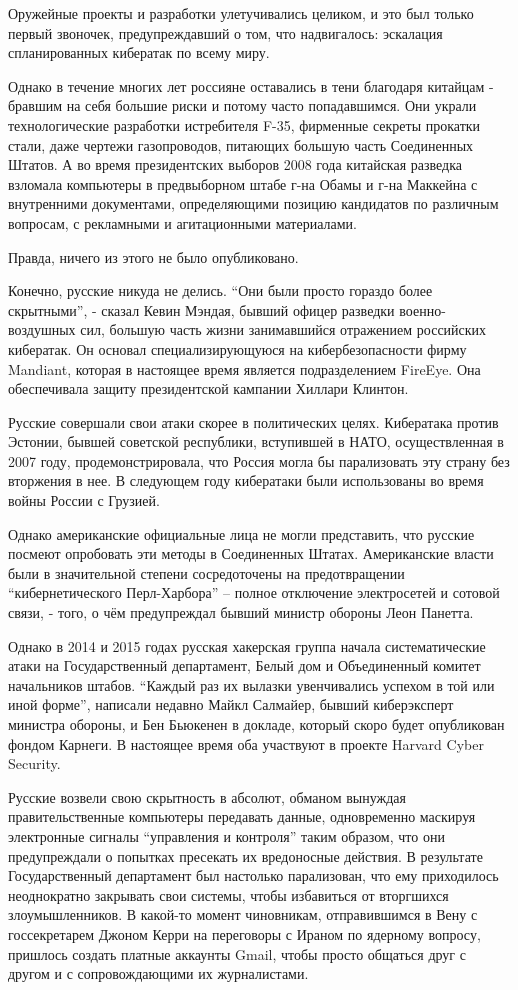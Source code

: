Оружейные проекты и разработки улетучивались целиком, и это был только
первый звоночек, предупреждавший о том, что надвигалось: эскалация
спланированных кибератак по всему миру.

Однако в течение многих лет россияне оставались в тени благодаря
китайцам - бравшим на себя большие риски и потому часто попадавшимся.
Они украли технологические разработки истребителя F-35, фирменные
секреты прокатки стали, даже чертежи газопроводов, питающих большую
часть Соединенных Штатов. А во время президентских выборов 2008 года
китайская разведка взломала компьютеры в предвыборном штабе г-на Обамы и
г-на Маккейна с внутренними документами, определяющими позицию
кандидатов по различным вопросам, с рекламными и агитационными
материалами.

Правда, ничего из этого не было опубликовано.

Конечно, русские никуда не делись. ``Они были просто гораздо более
скрытными'', - сказал Кевин Мэндая, бывший офицер разведки
военно-воздушных сил, большую часть жизни занимавшийся отражением
российских кибератак. Он основал специализирующуюся на кибербезопасности
фирму Mandiant, которая в настоящее время является подразделением
FireEye. Она обеспечивала защиту президентской кампании Хиллари Клинтон.

Русские совершали свои атаки скорее в политических целях. Кибератака
против Эстонии, бывшей советской республики, вступившей в НАТО,
осуществленная в 2007 году, продемонстрировала, что Россия могла бы
парализовать эту страну без вторжения в нее. В следующем году кибератаки
были использованы во время войны России с Грузией.

Однако американские официальные лица не могли представить, что русские
посмеют опробовать эти методы в Соединенных Штатах. Американские власти
были в значительной степени сосредоточены на предотвращении
``кибернетического Перл-Харбора'' -- полное отключение электросетей и
сотовой связи, - того, о чём предупреждал бывший министр обороны Леон
Панетта.

Однако в 2014 и 2015 годах русская хакерская группа начала
систематические атаки на Государственный департамент, Белый дом и
Объединенный комитет начальников штабов. ``Каждый раз их вылазки
увенчивались успехом в той или иной форме'', написали недавно Майкл
Салмайер, бывший киберэксперт министра обороны, и Бен Бьюкенен в
докладе, который скоро будет опубликован фондом Карнеги. В настоящее
время оба участвуют в проекте Harvard Cyber Security.

Русские возвели свою скрытность в абсолют, обманом вынуждая
правительственные компьютеры передавать данные, одновременно маскируя
электронные сигналы ``управления и контроля'' таким образом, что они
предупреждали о попытках пресекать их вредоносные действия. В результате
Государственный департамент был настолько парализован, что ему
приходилось неоднократно закрывать свои системы, чтобы избавиться от
вторгшихся злоумышленников. В какой-то момент чиновникам, отправившимся
в Вену с госсекретарем Джоном Керри на переговоры с Ираном по ядерному
вопросу, пришлось создать платные аккаунты Gmail, чтобы просто общаться
друг с другом и с сопровождающими их журналистами.


